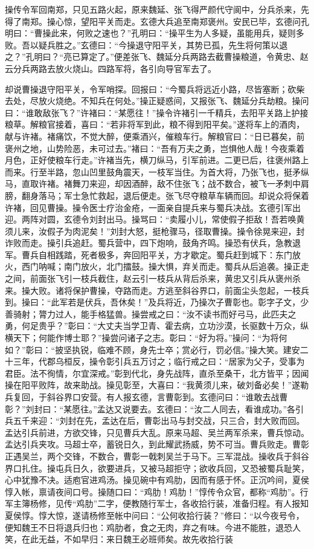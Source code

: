 操传令军回南郑，只见五路火起，原来魏延、张飞得严颜代守阆中，分兵杀来，先得了南郑。操心惊，望阳平关而走。玄德大兵追至南郑褒州。安民已毕，玄德问孔明曰：“曹操此来，何败之速也？”孔明曰：“操平生为人多疑，虽能用兵，疑则多败。吾以疑兵胜之。”玄德曰：“今操退守阳平关，其势已孤，先生将何策以退之？”孔明曰？“亮已算定了。”便差张飞、魏延分兵两路去截曹操粮道，令黄忠、赵云分兵两路去放火烧山。四路军将，各引向导官军去了。

却说曹操退守阳平关，令军哨探。回报曰：“今蜀兵将远近小路，尽皆塞断；砍柴去处，尽放火烧绝。不知兵在何处。”操正疑惑间，又报张飞、魏延分兵劫粮。操问曰：“谁敢敌张飞？”许褚曰：“某愿往！”操令许褚引一千精兵，去阳平关路上护接粮草。解粮官接着，喜曰：“若非将军到此，粮不得到阳平矣。”遂将车上的酒肉，献与许褚。褚痛饮，不觉大醉，便乘酒兴，催粮车行。解粮官曰：“日已暮矣，前褒州之地，山势险恶，未可过去。”褚曰：“吾有万夫之勇，岂惧他人哉！今夜乘着月色，正好使粮车行走。”许褚当先，横刀纵马，引军前进。二更已后，往褒州路上而来。行至半路，忽山凹里鼓角震天，一枝军当住。为首大将，乃张飞也，挺矛纵马，直取许褚。褚舞刀来迎，却因酒醉，敌不住张飞；战不数合，被飞一矛刺中肩膀，翻身落马；军士急忙救起，退后便走。张飞尽夺粮草车辆而回。却说众将保着许褚，回见曹操。操令医士疗治金疮，一面亲自提兵来与蜀兵决战。玄德引军出迎。两阵对圆，玄德令刘封出马。操骂曰：“卖履小儿，常使假子拒敌！吾若唤黄须儿来，汝假子为肉泥矣！”刘封大怒，挺枪骤马，径取曹操。操令徐晃来迎，封诈败而走。操引兵追赶。蜀兵营中，四下炮响，鼓角齐鸣。操恐有伏兵，急教退军。曹兵自相践踏，死者极多，奔回阳平关，方才歇定。蜀兵赶到城下：东门放火，西门呐喊；南门放火，北门擂鼓。操大惧，弃关而走。蜀兵从后追袭。操正走之间，前面张飞引一枝兵截住，赵云引一枝兵从背后杀来，黄忠又引兵从褒州杀来。操大败。诸将保护曹操，夺路而走。方逃至斜谷界口，前面尘头忽起，一枝兵到。操曰：“此军若是伏兵，吾休矣！”及兵将近，乃操次子曹彰也。彰字子文，少善骑射；膂力过人，能手格猛兽。操尝戒之曰：“汝不读书而好弓马，此匹夫之勇，何足贵乎？”彰曰：“大丈夫当学卫青、霍去病，立功沙漠，长驱数十万众，纵横天下；何能作博士耶？”操尝问诸子之志。彰曰：“好为将。”操问：“为将何如？”彰曰：“披坚执锐，临难不顾，身先士卒；赏必行，罚必信。”操大笑。建安二十三年，代郡乌桓反，操令彰引兵五万讨之；临行戒之曰：“居家为父子，受事为君臣。法不徇情，尔宜深戒。”彰到代北，身先战阵，直杀至桑干，北方皆平；因闻操在阳平败阵，故来助战。操见彰至，大喜曰：“我黄须儿来，破刘备必矣！”遂勒兵复回，于斜谷界口安营。有人报玄德，言曹彰到。玄德问曰：“谁敢去战曹彰？”刘封曰：“某愿往。”孟达又说要去。玄德曰：“汝二人同去，看谁成功。”各引兵五千来迎：“刘封在先，孟达在后，曹彰出马与封交战，只三合，封大败而回。孟达引兵前进，方欲交锋，只见曹兵大乱。原来马超、吴兰两军杀来，曹兵惊动。孟达引兵夹攻。马超士卒，蓄锐日久，到此耀武扬威，势不可当。曹兵败走。曹彰正遇吴兰，两个交锋，不数合，曹彰一戟刺吴兰于马下。三军混战。操收兵于斜谷界口扎住。操屯兵日久，欲要进兵，又被马超拒守；欲收兵回，又恐被蜀兵耻笑，心中犹豫不决。适庖官进鸡汤。操见碗中有鸡肋，因而有感于怀。正沉吟间，夏侯惇入帐，禀请夜间口号。操随口曰：“鸡肋！鸡肋！”惇传令众官，都称“鸡肋”。行军主簿杨修，见传“鸡肋”二字，便教随行军士，各收拾行装，准备归程。有人报知夏侯惇。惇大惊，遂请杨修至帐中问曰：“公何收拾行装？”修曰：“以今夜号令，便知魏王不日将退兵归也：鸡肋者，食之无肉，弃之有味。今进不能胜，退恐人笑，在此无益，不如早归：来日魏王必班师矣。故先收拾行装